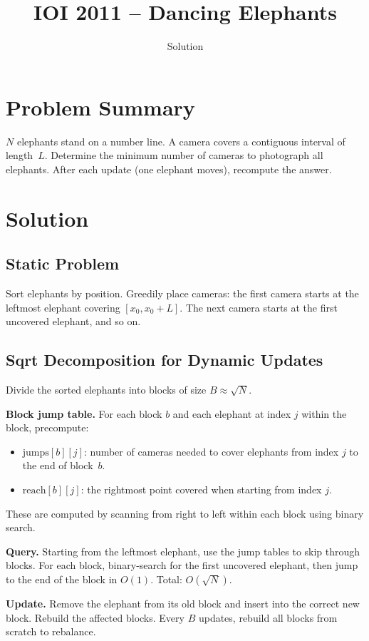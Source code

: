 \documentclass[11pt,a4paper]{article}
\title{IOI 2011 -- Dancing Elephants}
\author{Solution}
\date{}
\begin{document}
\maketitle

\section{Problem Summary}
$N$ elephants stand on a number line. A camera covers a contiguous interval of length~$L$. Determine the minimum number of cameras to photograph all elephants. After each update (one elephant moves), recompute the answer.

\section{Solution}

\subsection{Static Problem}
Sort elephants by position. Greedily place cameras: the first camera starts at the leftmost elephant covering $[x_0, x_0 + L]$. The next camera starts at the first uncovered elephant, and so on.

\subsection{Sqrt Decomposition for Dynamic Updates}
Divide the sorted elephants into blocks of size $B \approx \sqrt{N}$.

\textbf{Block jump table.} For each block $b$ and each elephant at index $j$ within the block, precompute:
\begin{itemize}
    \item $\text{jumps}[b][j]$: number of cameras needed to cover elephants from index $j$ to the end of block~$b$.
    \item $\text{reach}[b][j]$: the rightmost point covered when starting from index $j$.
\end{itemize}
These are computed by scanning from right to left within each block using binary search.

\textbf{Query.} Starting from the leftmost elephant, use the jump tables to skip through blocks. For each block, binary-search for the first uncovered elephant, then jump to the end of the block in $O(1)$. Total: $O(\sqrt{N})$.

\textbf{Update.} Remove the elephant from its old block and insert into the correct new block. Rebuild the affected blocks. Every $B$ updates, rebuild all blocks from scratch to rebalance.
\end{document}
